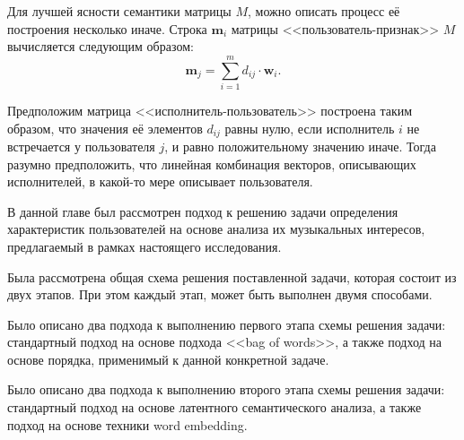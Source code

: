 Для лучшей ясности семантики матрицы $M$, можно описать
процесс её построения несколько иначе. Строка $\bm{m}_i$ матрицы 
<<пользователь-признак>> $M$ вычисляется следующим образом:
\[
    \bm{m}_j = \sum_{i=1}^{m} d_{ij} \cdot \bm{w}_i.
\]

Предположим матрица <<исполнитель-пользователь>> построена 
таким образом, что значения её элементов $d_{ij}$ равны нулю,
если исполнитель $i$ не встречается у пользователя $j$, и равно
положительному значению иначе. Тогда разумно предположить, что
линейная комбинация векторов, описывающих исполнителей, 
в какой-то мере описывает пользователя.

\chapterconclusion

В данной главе был рассмотрен подход к решению задачи
определения характеристик пользователей на основе анализа
их музыкальных интересов, предлагаемый в рамках настоящего
исследования. 

Была рассмотрена общая схема решения поставленной задачи,
которая состоит из двух этапов. При этом каждый этап, может
быть выполнен двумя способами.

Было описано два подхода к выполнению первого этапа схемы
решения задачи: стандартный подход на основе подхода
<<bag of words>>, а также подход на основе порядка, применимый
к данной конкретной задаче.

Было описано два подхода к выполнению второго этапа схемы
решения задачи: стандартный подход на основе латентного
семантического анализа, а также подход на основе техники
word embedding.
